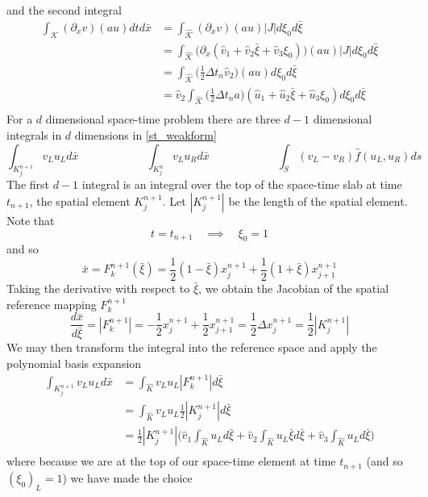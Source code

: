 \documentclass[11pt, oneside]{article}   	%
\begin{document}
and the second integral 
\begin{equation}\label{div_v_2}
\begin{split}
\int_{\mathcal{K}} (\partial_x v)(au) dtd\bar{x}
	&= \int_{\mathcal{\hat{K}}} (\partial_x v)(au) |J| d\xi_0 d\bar{\xi}\\
	&= \int_{\mathcal{\hat{K}}} \big(\partial_x (\hat{v}_1 + \hat{v}_2 \bar{\xi} + \hat{v}_3 \xi_0)\big)(au) |J| d\xi_0 d\bar{\xi}\\
	&= \int_{\mathcal{\hat{K}}} \bigg( \frac{1}{2} \Delta t_n \hat{v}_2\bigg)(au) d\xi_0 d\bar{\xi}\\
	&= \hat{v}_2 \int_{\mathcal{\hat{K}}} \bigg( \frac{1}{2} \Delta t_n a \bigg)(\hat{u}_1 + \hat{u}_2 \bar{\xi} + \hat{u}_3 \xi_0) d\xi_0 d\bar{\xi}\\
\end{split}
\end{equation}
For a $d$ dimensional space-time problem there are three $d-1$ dimensional integrals in $d$ dimensions in \eqref{st_weakform}
\[ \int_{K_j^{n+1}} v_L u_L d\bar{x} \qquad\qquad\qquad \int_{K_j^n} v_L u_R d\bar{x} \qquad\qquad\qquad \int_S (v_L - v_R) \hat{f}(u_L,u_R)ds \]
The first $d-1$ integral is an integral over the top of the space-time slab at time $t_{n+1}$, the spatial element $K_j^{n+1}$.
Let $|K_j^{n+1}|$ be the length of the spatial element.
Note that
\[ t = t_{n+1} \quad\implies\quad \xi_0 = 1 \] 
and so
\[ \bar{x} = F_k^{n+1}(\bar{\xi}) = \frac{1}{2}(1-\bar{\xi})x_j^{n+1} + \frac{1}{2}(1+\bar{\xi})x_{j+1}^{n+1} \]
Taking the derivative with respect to $\bar{\xi}$, we obtain the Jacobian of the spatial reference mapping $F_k^{n+1}$
\[ \frac{d\bar{x}}{d\bar{\xi}} = |F_k^{n+1}| = -\frac{1}{2}x_j^{n+1} + \frac{1}{2}x_{j+1}^{n+1} = \frac{1}{2}\Delta x_j^{n+1} = \frac{1}{2}|K_j^{n+1}| \]
We may then transform the integral into the reference space and apply the polynomial basis expansion
\begin{equation}\label{Kn1_integral}
\begin{split}
\int_{K_j^{n+1}}v_L u_L d\bar{x} &= \int_{\hat{K}}v_L u_L |F_k^{n+1}|d\bar{\xi}\\
&= \int_{\hat{K}}v_L u_L \frac{1}{2}|K_j^{n+1}|d\bar{\xi}\\
&= \frac{1}{2}|K_j^{n+1}| \big( \hat{v}_1 \int_{\hat{K}}u_L d\bar{\xi} + \hat{v}_2 \int_{\hat{K}}u_L\bar{\xi}d\bar{\xi} + \hat{v}_3 \int_{\hat{K}}u_L d\bar{\xi} \big)\\
\end{split}
\end{equation}
where because we are at the top of our space-time element at time $t_{n+1}$ (and so $(\xi_0)_L = 1$) we have made the choice
\end{document}
